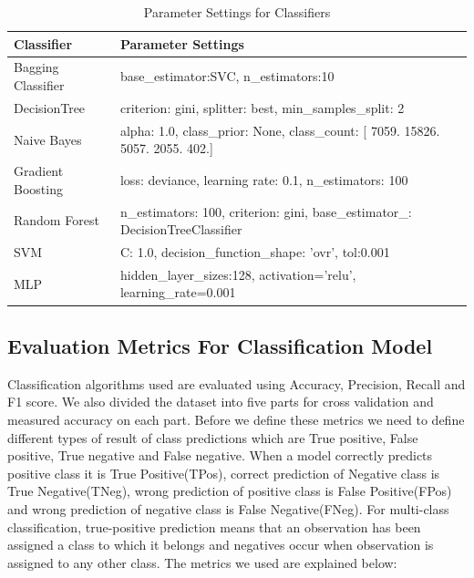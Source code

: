 \begin{table}[H]
    \centering
    \begin{tabular}{|l|l|}
    \hline
        \textbf{Classifier} & \textbf{Parameter Settings} \\ \hline
        Bagging Classifier & base\_estimator:SVC, n\_estimators:10 \\ \hline
        DecisionTree & criterion: gini, splitter: best, min\_samples\_split: 2 \\ \hline
        Naive Bayes & alpha: 1.0, class\_prior: None, class\_count: [ 7059. 15826.  5057.  2055.   402.] \\ \hline
        Gradient Boosting & loss: deviance, learning rate: 0.1, n\_estimators: 100 \\ \hline
        Random Forest & n\_estimators: 100, criterion: gini, base\_estimator\_: DecisionTreeClassifier \\ \hline
        SVM & C: 1.0, decision\_function\_shape: 'ovr', tol:0.001 \\ \hline
        MLP & hidden\_layer\_sizes:128, activation='relu', learning\_rate=0.001 \\ \hline
    \end{tabular}
    \caption{Parameter Settings for Classifiers}
    \label{table:parametersClassifiers}
\end{table}

\subsection{Evaluation Metrics For Classification Model}
\label{subsection:evaluationMetrics}
Classification algorithms used are evaluated using Accuracy, Precision, Recall and F1 score. We also divided the dataset into five parts for cross validation and measured accuracy on each part. Before we define these metrics we need to define different types of result of class predictions which are True positive, False positive, True negative and False negative. When a model correctly predicts positive class it is True Positive(TPos), correct prediction of Negative class is True Negative(TNeg), wrong prediction of positive class is False Positive(FPos) and wrong prediction of negative class is False Negative(FNeg). For multi-class classification, true-positive prediction means that an observation has been assigned a class to which it belongs and negatives occur when observation is assigned to any other class. The metrics we used are explained below:

